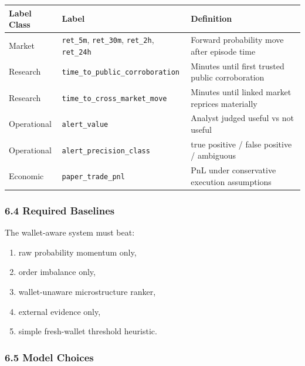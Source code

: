 \documentclass[
]{article}
\newcounter{none} %
\providecommand{\tightlist}{%
  \setlength{\itemsep}{0pt}\setlength{\parskip}{0pt}}
\begin{document}
{\def\LTcaptype{none} %
\begin{longtable}[]{@{}lll@{}}
\toprule\noalign{}
Label Class & Label & Definition \\
\midrule\noalign{}
\endhead
\bottomrule\noalign{}
\endlastfoot
Market & \texttt{ret\_5m}, \texttt{ret\_30m}, \texttt{ret\_2h},
\texttt{ret\_24h} & Forward probability move after episode time \\
Research & \texttt{time\_to\_public\_corroboration} & Minutes until
first trusted public corroboration \\
Research & \texttt{time\_to\_cross\_market\_move} & Minutes until linked
market reprices materially \\
Operational & \texttt{alert\_value} & Analyst judged useful vs not
useful \\
Operational & \texttt{alert\_precision\_class} & true positive / false
positive / ambiguous \\
Economic & \texttt{paper\_trade\_pnl} & PnL under conservative execution
assumptions \\
\end{longtable}
}

\subsubsection{6.4 Required Baselines}\label{64-required-baselines}

The wallet-aware system must beat:

\begin{enumerate}
\def\labelenumi{\arabic{enumi}.}
\tightlist
\item
  raw probability momentum only,
\item
  order imbalance only,
\item
  wallet-unaware microstructure ranker,
\item
  external evidence only,
\item
  simple fresh-wallet threshold heuristic.
\end{enumerate}

\subsubsection{6.5 Model Choices}\label{65-model-choices}
\end{document}
